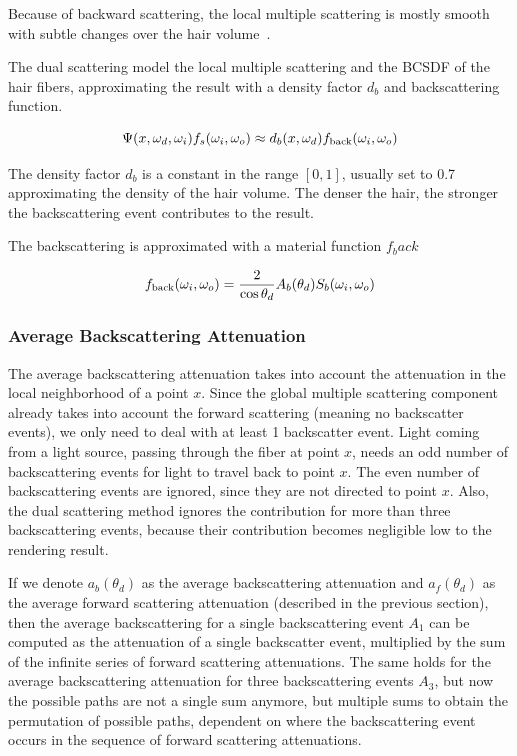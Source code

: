 Because of backward scattering, the local multiple scattering is mostly smooth with subtle changes over the hair volume~\cite{zinke}.

The dual scattering model the local multiple scattering and the BCSDF of the hair fibers, approximating the result with a density factor $d_b$ and backscattering function.

\begin{equation}
\Psi(x, \omega_d, \omega_i) f_s(\omega_i, \omega_o) \approx d_b(x, \omega_d) f_{\textnormal{back}}(\omega_i, \omega_o)
\end{equation}

The density factor $d_b$ is a constant in the range $[0, 1]$, usually set to 0.7 approximating the density of the hair volume. The denser the hair, the stronger the backscattering event contributes to the result.

The backscattering is approximated with a material function $f_back$

\begin{equation}
f_{\textnormal{back}}(\omega_i, \omega_o) = \frac{2}{\cos \theta_d}A_b(\theta_d) S_b(\omega_i, \omega_o)
\end{equation}

\subsubsection{Average Backscattering Attenuation}

The average backscattering attenuation takes into account the attenuation in the local neighborhood of a point $x$. Since the global multiple scattering component already takes into account the forward scattering (meaning no backscatter events), we only need to deal with at least 1 backscatter event. Light coming from a light source, passing through the fiber at point $x$, needs an odd number of backscattering events for light to travel back to point $x$. The even number of backscattering events are ignored, since they are not directed to point $x$. Also, the dual scattering method ignores the contribution for more than three backscattering events, because their contribution becomes negligible low to the rendering result. 

If we denote $a_b(\theta_d)$ as the average backscattering attenuation and $a_f(\theta_d)$ as the average forward scattering attenuation (described in the previous section), then the average backscattering for a single backscattering event $A_1$ can be computed as the attenuation of a single backscatter event, multiplied by the sum of the infinite series of forward scattering attenuations. The same holds for the average backscattering attenuation for three backscattering events $A_3$, but now the possible paths are not a single sum anymore, but multiple sums to obtain the permutation of possible paths, dependent on where the backscattering event occurs in the sequence of forward scattering attenuations.

